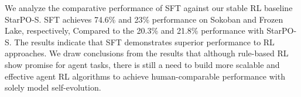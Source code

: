 We analyze the comparative performance of SFT against our stable RL baseline StarPO-S. SFT achieves 74.6\% and 23\% performance on Sokoban and Frozen Lake, respectively, Compared to the 20.3\% and 21.8\% performance with StarPO-S. The results indicate that SFT demonstrates superior performance to RL approaches. We draw conclusions from the results that although rule-based RL show promise for agent tasks, there is still a need to build more scalable and effective agent RL algorithms to achieve human-comparable performance with solely model self-evolution.


% 
% 